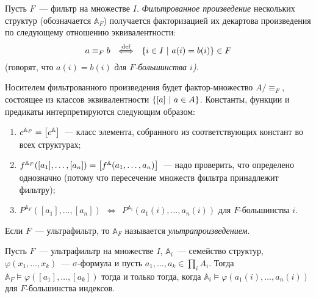 \begin{definition}
    Пусть $F$~— фильтр на множестве $I$. \emph{Фильтрованное произведение} нескольких структур (обозначается $\mathbb{A}_F$) получается факторизацией их декартова произведения по следующему отношению эквивалентности:
	\[a \equiv_F b\ \ \overset{\text{def}}{\Longleftrightarrow}\ \ 
	  \set*{i \in I\ \middle\vert\ a(i) = b(i)} \in F\]    
    (говорят, что $a(i) = b(i)$ \emph{для $F$-большинства $i$).}

    Носителем фильтрованного произведения будет фактор-множество \(A / {\equiv_F}\), состоящее из классов эквивалентности \(\set*{ \segment*{a}\ \middle\vert\ a \in A}\). Константы, функции и предикаты интерпретируются следующим образом:
    \begin{enumerate}
	\item $c^{\mathbb{A}_F} = \segment*{c^{\mathbb{A}}}$~— класс элемента, собранного из соответствующих констант во всех структурах;
	\item $f^{\mathbb{A}_F}\lr*{[a_1], \ldots, [a_n]} =
	      \segment*{f^{\mathbb{A}}\lr*{a_1, \ldots, a_n}}$~— надо проверить, что определено однозначно (потому что пересечение множеств фильтра принадлежит фильтру); 
	\item $P^{\mathbb{A}_F}([a_1], \ldots, [a_n])\ \ \Longleftrightarrow\ \ 
	       P^{\mathbb{A}_i} (a_1(i), \ldots, a_n(i))$ для $F$-большинства $i$. 
    \end{enumerate}
\end{definition} 

    Если $F$~— ультрафильтр, то $\mathbb{A}_{F}$ называется \textit{ультрапроизведением}.


\begin{theorem} %
    Пусть $F$~— ультрафильтр на множестве $I$, $\mathbb{A}_i$~— семейство структур, $\varphi(x_1, \ldots, x_k)$~— $\sigma$-формула и пусть $a_1, \ldots, a_k \in \prod_i A_i$. Тогда $\mathbb{A}_F \models \varphi([a_1], \ldots, [a_k])$ тогда и только тогда, когда $\mathbb{A}_i \models \varphi(a_1(i), \ldots, a_n(i))$ для $F$-большинства индексов.
\end{theorem} 




